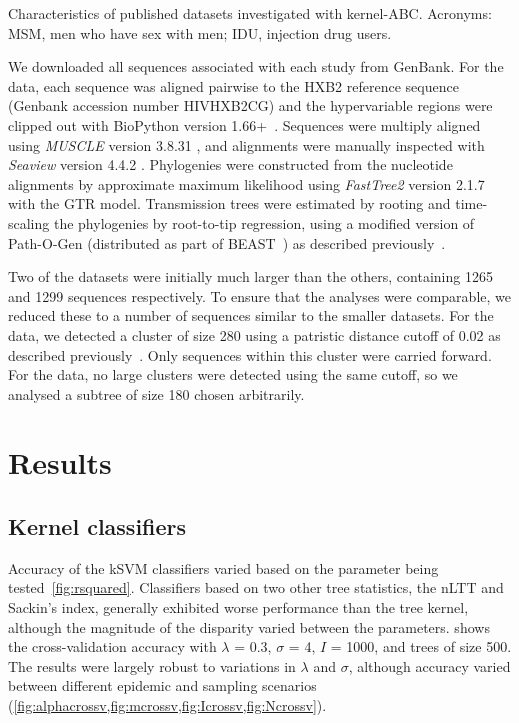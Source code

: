 \documentclass[12pt]{article}\usepackage[]{graphicx}\usepackage[]{color}
\newcommand{\software}[1]{\textit{#1}}
\newcommand{\tablepath}{../tables}
\begin{document}
\begin{table}[ht]
  \centering
  
  \caption{Characteristics of published datasets investigated with kernel-ABC.
  Acronyms: MSM, men who have sex with men; IDU, injection drug users.}
  \label{tab:data}
\end{table}

We downloaded all sequences associated with each study from GenBank. For the
\textcite{novitsky2014impact} data, each sequence was aligned pairwise to the
HXB2 reference sequence (Genbank accession number HIVHXB2CG) and the
hypervariable regions were clipped out with BioPython version
1.66+~\autocite{cock2009biopython}. Sequences were multiply aligned using
\software{MUSCLE} version 3.8.31 \autocite{edgar2004muscle}, and alignments
were manually inspected with \software{Seaview} version 4.4.2
\autocite{gouy2010seaview}. Phylogenies were constructed from the nucleotide
alignments by approximate maximum likelihood using \software{FastTree2} version
2.1.7 with the \gls{GTR} model. Transmission trees were estimated by rooting
and time-scaling the phylogenies by root-to-tip regression, using a modified
version of Path-O-Gen (distributed as part of
BEAST~\autocite{drummond2007beast}) as described
previously~\autocite{poon2015phylodynamic}. 

Two of the datasets \autocite{li2015hiv,novitsky2014impact} were initially much
larger than the others, containing 1265 and 1299 sequences respectively. To
ensure that the analyses were comparable, we reduced these to a number of
sequences similar to the smaller datasets. For the \textcite{li2015hiv} data,
we detected a cluster of size 280 using a patristic distance cutoff of 0.02 as
described previously~\autocite{poon2014impact}. Only sequences within this
cluster were carried forward. For the \textcite{novitsky2014impact} data, no
large clusters were detected using the same cutoff, so we analysed a subtree of
size 180 chosen arbitrarily.

\section*{Results}

\subsection*{Kernel classifiers}



Accuracy of the \gls{kSVM} classifiers varied based on the parameter being
tested~\cref{fig:rsquared}. Classifiers based on two other tree statistics, the
\gls{nLTT} and Sackin's index, generally exhibited worse performance than the
tree kernel, although the magnitude of the disparity varied between the
parameters.  shows the cross-validation accuracy with
$\lambda$ = 0.3, $\sigma$ = 4, $I$ = 1000, and trees of size 500. The results
were largely robust to variations in $\lambda$ and $\sigma$, although accuracy
varied between different epidemic and sampling scenarios
(\cref{fig:alphacrossv,fig:mcrossv,fig:Icrossv,fig:Ncrossv}).
\end{document}
